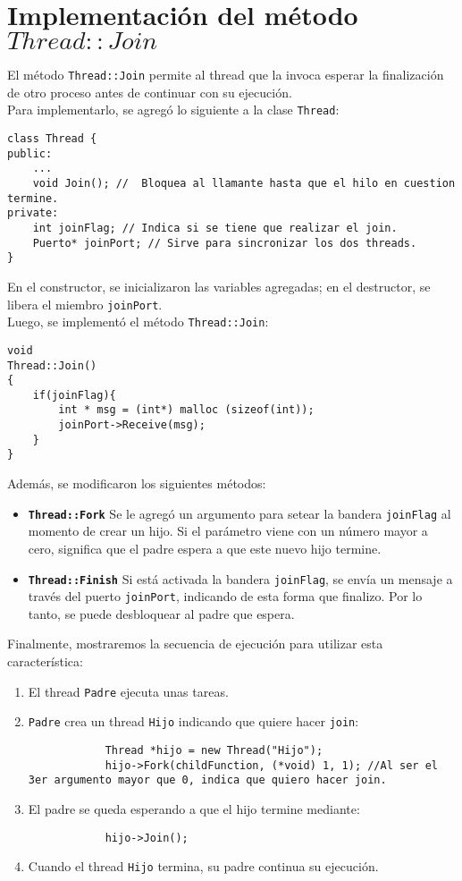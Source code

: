 \section{Implementación del método $Thread::Join$}
El método \texttt{Thread::Join} permite al thread que la invoca esperar la finalización de otro proceso antes de continuar con su ejecución.\\
Para implementarlo, se agregó lo siguiente a la clase \texttt{Thread}:
\begin{lstlisting}[style=C]
class Thread {
public:
	...
	void Join(); //  Bloquea al llamante hasta que el hilo en cuestion termine.
private:
	int joinFlag; // Indica si se tiene que realizar el join.
	Puerto* joinPort; // Sirve para sincronizar los dos threads.
}
\end{lstlisting}
En el constructor, se inicializaron las variables agregadas; en el destructor, se libera el miembro \texttt{joinPort}.\\
Luego, se implementó el método \texttt{Thread::Join}:
\begin{lstlisting}
void
Thread::Join()
{
    if(joinFlag){
        int * msg = (int*) malloc (sizeof(int));
        joinPort->Receive(msg);
    }
}
\end{lstlisting}
Además, se modificaron los siguientes métodos:
\begin{itemize}
	\item \textbf{\texttt{Thread::Fork}} Se le agregó un argumento para setear la bandera \texttt{joinFlag} al momento de crear un hijo. Si el parámetro viene con un número mayor a cero, significa que el padre espera a que este nuevo hijo termine.
	\item \textbf{\texttt{Thread::Finish}} Si está activada la bandera \texttt{joinFlag}, se envía un mensaje a través del puerto \texttt{joinPort}, indicando de esta forma que finalizo. Por lo tanto, se puede desbloquear al padre que espera.
\end{itemize}
Finalmente, mostraremos la secuencia de ejecución para utilizar esta característica:
\begin{enumerate}
    \item El thread \texttt{Padre} ejecuta unas tareas.
    \item \texttt{Padre} crea un thread \texttt{Hijo} indicando que quiere hacer \texttt{join}:
        \begin{lstlisting}
            Thread *hijo = new Thread("Hijo");
            hijo->Fork(childFunction, (*void) 1, 1); //Al ser el 3er argumento mayor que 0, indica que quiero hacer join.
         \end{lstlisting}
    \item El padre se queda esperando a que el hijo termine mediante:
        \begin{lstlisting}
            hijo->Join();
        \end{lstlisting}
    \item Cuando el thread \texttt{Hijo} termina, su padre continua su ejecución.
\end{enumerate}
